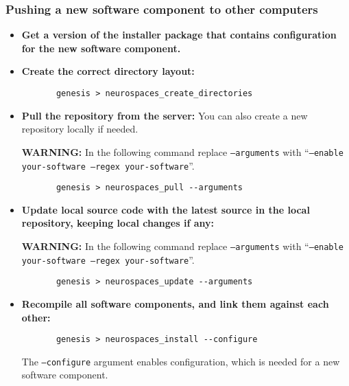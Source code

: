 \documentclass[12pt]{article}
\begin{document}
\subsubsection*{Pushing a new software component to other computers}

\begin{itemize}

	\item {\bf Get a version of the installer package that contains configuration for the new software component.}
	
	\item {\bf Create the correct directory layout:}
	\begin{verbatim}
	   genesis > neurospaces_create_directories
	\end{verbatim}

	\item {\bf Pull the repository from the server:} You can also create a new repository locally if needed.
	
	{\bf WARNING:} In the following command replace {\tt --arguments} with ``{\tt --enable your-software --regex your-software}''.

	\begin{verbatim}
	   genesis > neurospaces_pull --arguments
	\end{verbatim}
	
	\item {\bf Update local source code with the latest source in the local repository, keeping local changes if any:}
	
	{\bf WARNING:} In the following command replace {\tt --arguments} with ``{\tt --enable your-software --regex your-software}''.

	\begin{verbatim}
	   genesis > neurospaces_update --arguments
	\end{verbatim}
	
	\item {\bf Recompile all software components, and link them against each other:} 
	\begin{verbatim}
	   genesis > neurospaces_install --configure
	\end{verbatim}
	The {\tt --configure} argument enables configuration, which is needed for a new software component.
\end{itemize}
\end{document}
